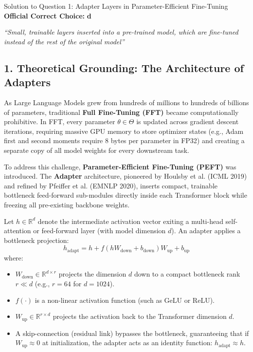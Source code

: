\documentclass[11pt,a4paper]{article}
\begin{document}
\begin{solutionbox}{Solution to Question 1: Adapter Layers in Parameter-Efficient Fine-Tuning}
\textbf{Official Correct Choice:} \textbf{d}
\begin{center}
    \textit{``Small, trainable layers inserted into a pre-trained model, which are fine-tuned instead of the rest of the original model''}
\end{center}

\medskip
\subsection*{1. Theoretical Grounding: The Architecture of Adapters}
As Large Language Models grew from hundreds of millions to hundreds of billions of parameters, traditional \textbf{Full Fine-Tuning (FFT)} became computationally prohibitive. In FFT, every parameter $\theta \in \Theta$ is updated across gradient descent iterations, requiring massive GPU memory to store optimizer states (e.g., Adam first and second moments require $8$ bytes per parameter in FP32) and creating a separate copy of all model weights for every downstream task.

To address this challenge, \textbf{Parameter-Efficient Fine-Tuning (PEFT)} was introduced. The \textbf{Adapter} architecture, pioneered by Houlsby et al. (ICML 2019) and refined by Pfeiffer et al. (EMNLP 2020), inserts compact, trainable bottleneck feed-forward sub-modules directly inside each Transformer block while freezing all pre-existing backbone weights.

\begin{tcolorbox}[colback=white,colframe=secondary,arc=2mm,title=\textbf{Mathematical Formulation of Houlsby Adapter Module}]
Let $h \in \mathbb{R}^{d}$ denote the intermediate activation vector exiting a multi-head self-attention or feed-forward layer (with model dimension $d$). An adapter applies a bottleneck projection:
\begin{equation}
    h_{\text{adapt}} = h + f\left(h W_{\text{down}} + b_{\text{down}}\right) W_{\text{up}} + b_{\text{up}}
\end{equation}
where:
\begin{itemize}[leftmargin=1.5em,itemsep=1pt]
    \item $W_{\text{down}} \in \mathbb{R}^{d \times r}$ projects the dimension $d$ down to a compact bottleneck rank $r \ll d$ (e.g., $r = 64$ for $d = 1024$).
    \item $f(\cdot)$ is a non-linear activation function (such as GeLU or ReLU).
    \item $W_{\text{up}} \in \mathbb{R}^{r \times d}$ projects the activation back to the Transformer dimension $d$.
    \item A skip-connection (residual link) bypasses the bottleneck, guaranteeing that if $W_{\text{up}} \approx 0$ at initialization, the adapter acts as an identity function: $h_{\text{adapt}} \approx h$.
\end{itemize}
\end{tcolorbox}


\end{solutionbox}
\end{document}
